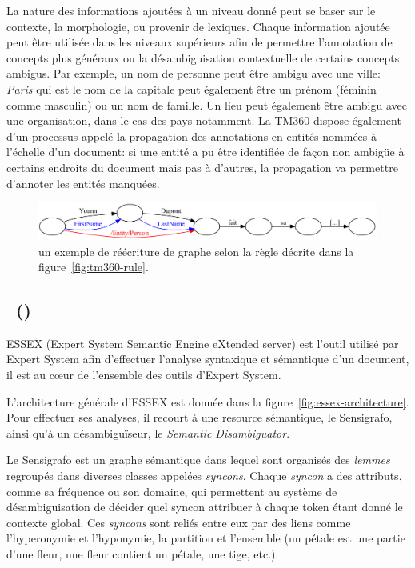 \documentclass[12pt,a4paper,times,twoside,openright]{report}
\begin{document}
La nature des informations ajoutées à un niveau donné peut se baser sur le contexte, la morphologie, ou provenir de lexiques. Chaque information ajoutée peut être utilisée dans les niveaux supérieurs afin de permettre l'annotation de concepts plus généraux ou la désambiguisation contextuelle de certains concepts ambigus. Par exemple, un nom de personne peut être ambigu avec une ville: \emph{Paris} qui est le nom de la capitale peut également être un prénom (féminin comme masculin) ou un nom de famille. Un lieu peut également être ambigu avec une organisation, dans le cas des pays notamment. La TM360 dispose également d'un processus appelé la propagation des annotations en entités nommées à l'échelle d'un document: si une entité a pu être identifiée de façon non ambigüe à certains endroits du document mais pas à d'autres, la propagation va permettre d'annoter les entités manquées.

\begin{figure}[ht!]
\centering
\includegraphics[scale=0.6]{images/Luxid/sentence1}
\caption{un exemple de réécriture de graphe selon la règle décrite dans la figure\ \ref{fig:tm360-rule}.}
\label{fig:tm360-application}
\end{figure}


        
        \subsection{\ESSEX\ (\ExpertSystem)}
ESSEX (Expert System Semantic Engine eXtended server) est l'outil utilisé par Expert System afin d'effectuer l'analyse syntaxique et sémantique d'un document, il est au c\oe ur de l'ensemble des outils d'Expert System.

L'architecture générale d'ESSEX est donnée dans la figure\ \ref{fig:essex-architecture}. Pour effectuer ses analyses, il recourt à une resource sémantique, le Sensigrafo, ainsi qu'à un désambiguïseur, le \emph{Semantic Disambiguator}.

Le Sensigrafo est un graphe sémantique dans lequel sont organisés des \emph{lemmes} regroupés dans diverses classes appelées \emph{syncons}. Chaque \emph{syncon} a des attributs, comme sa fréquence ou son domaine, qui permettent au système de désambiguisation de décider quel syncon attribuer à chaque token étant donné le contexte global. Ces \emph{syncons} sont reliés entre eux par des liens comme l'hyperonymie et l'hyponymie, la partition et l'ensemble (un pétale est une partie d'une fleur, une fleur contient un pétale, une tige, etc.).
\end{document}
